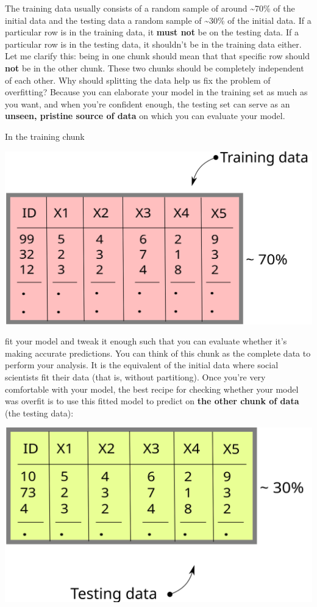 \documentclass[
]{book}
\begin{document}
The training data usually consists of a random sample of around \textasciitilde70\% of the initial data and the testing data a random sample of \textasciitilde30\% of the initial data. If a particular row is in the training data, it \textbf{must not} be on the testing data. If a particular row is in the testing data, it shouldn't be in the training data either. Let me clarify this: being in one chunk should mean that that specific row should \textbf{not} be in the other chunk. These two chunks should be completely independent of each other. Why should splitting the data help us fix the problem of overfitting? Because you can elaborate your model in the training set as much as you want, and when you're confident enough, the testing set can serve as an \textbf{unseen, pristine source of data} on which you can evaluate your model.

In the training chunk

\begin{center}\includegraphics[width=0.5\linewidth]{./img/training_df} \end{center}

fit your model and tweak it enough such that you can evaluate whether it's making accurate predictions. You can think of this chunk as the complete data to perform your analysis. It is the equivalent of the initial data where social scientists fit their data (that is, without partitiong). Once you're very comfortable with your model, the best recipe for checking whether your model was overfit is to use this fitted model to predict on \textbf{the other chunk of data} (the testing data):

\begin{center}\includegraphics[width=0.5\linewidth]{./img/testing_df} \end{center}
\end{document}
